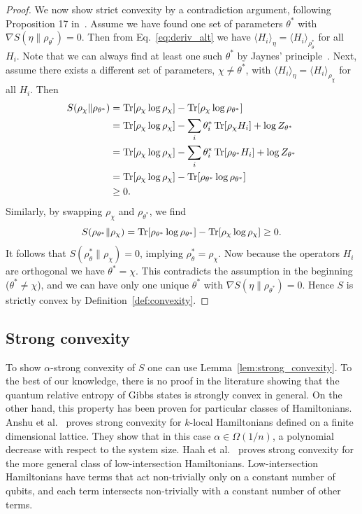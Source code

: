 \documentclass[
    reprint,
    aps,
    prx,
    longbibliography
]{revtex4-2}
\begin{document}
\begin{proof}
We now show strict convexity by a contradiction argument, following Proposition 17 in~\cite{Anshu_2021}. Assume we have found one set of parameters $\theta^*$ with $\nabla S(\eta \|\rho_{\theta^*})=0$. Then from Eq.~\eqref{eq:deriv_alt} we have $\langle H_{i}\rangle_\eta =\langle H_{i} \rangle_{\rho_\theta^*}$ for all $H_{i}$. Note that we can always find at least one such $\theta^*$ by Jaynes' principle~\cite{jaynes1957}. Next, assume there exists a different set of parameters, $\chi\neq\theta^*$, with $\langle H_{i}\rangle_\eta =\langle H_{i} \rangle_{\rho_\chi}$ for all $H_{i}$. Then
\begin{align}
\begin{split}
S(\rho_\chi \| \rho_{\theta^*}) &= \Tr[ \rho_\chi\log{\rho_\chi} ]-\Tr[ \rho_\chi\log{\rho_{\theta^*}} ] \\
&= \Tr[\rho_\chi\log{\rho_\chi}] - \sum_{i}\theta^*_{i}\Tr[\rho_\chi H_{i}] +\log{Z_{\theta^*}} \\
&= \Tr[\rho_\chi\log{\rho_\chi}] - \sum_{i}\theta^*_{i}\Tr[\rho_{\theta^*} H_{i}] +\log{Z_{\theta^*}} \\
&= \Tr[\rho_\chi\log{\rho_\chi}] - \Tr[\rho_{\theta^*}\log{\rho_{\theta^*}}] \\
&\geq 0. 
\end{split}
\end{align} 
Similarly, by swapping $\rho_\chi$ and $\rho_{\theta^*}$, we find \begin{equation}
S(\rho_{\theta^*}\|\rho_\chi) = \Tr[\rho_{\theta^*}\log{\rho_{\theta^*}}] - \Tr[\rho_\chi\log{\rho_\chi}] \geq 0.
\end{equation} 
It follows that $S(\rho_\theta^*\|\rho_\chi)=0$, implying $\rho_\theta^* = \rho_\chi$. Now because the operators $H_{i}$ are orthogonal we have $\theta^*=\chi$. This contradicts the assumption in the beginning ($\theta^*\neq\chi$), and we can have only one unique $\theta^*$ with $\nabla S(\eta \|\rho_{\theta^*})=0$. Hence $S$ is strictly convex by Definition~\ref{def:convexity}.
\end{proof}


\subsection*{Strong convexity}

To show $\alpha$-strong convexity of $S$ one can use Lemma~\ref{lem:strong_convexity}. To the best of our knowledge, there is no proof in the literature showing that the quantum relative entropy of Gibbs states is strongly convex in general. On the other hand, this property has been proven for particular classes of Hamiltonians. Anshu et al.~\cite{Anshu_2021} proves strong convexity for $k$-local Hamiltonians defined on a finite dimensional lattice. They show that in this case $\alpha \in \Omega(1/n)$, a polynomial decrease with respect to the system size. Haah et al.~\cite{Haah_2024} proves strong convexity for the more general class of low-intersection Hamiltonians. Low-intersection Hamiltonians have terms that act non-trivially only on a constant number of qubits, and each term intersects non-trivially with a constant number of other terms.
\end{document}
